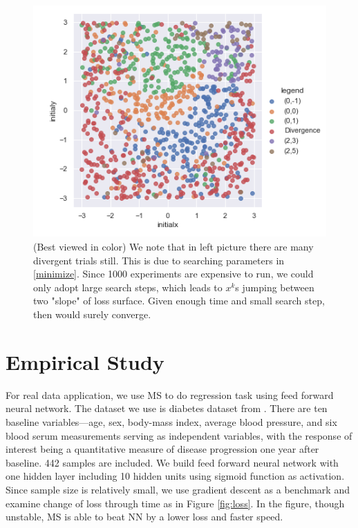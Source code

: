 \documentclass[10pt, oneside]{article}
\begin{document}
  \begin{figure}[H]
\centering

  \includegraphics[width=0.8\linewidth]{convergence1.png}

   \caption{(Best viewed in color) We note that in left picture there are many divergent trials still. This is due to searching parameters in \ref{minimize}. Since 1000 experiments are expensive to run, we could only adopt large search steps, which leads to $x^k$s jumping between two "slope" of loss surface. Given enough time and small search step, then would surely converge.}
\label{fig:convergence}
  \end{figure}
  

\section{Empirical Study}

For real data application, we use MS to do regression task using feed forward neural network. The dataset we use is diabetes dataset from \cite{lars}. There are ten baseline variables---age, sex, body-mass index, average blood pressure, and six blood serum measurements serving as independent variables, with the response of interest being a quantitative measure of disease progression one year after baseline. 442 samples are included. We build feed forward neural network with one hidden layer including 10 hidden units using sigmoid function as activation. Since sample size is relatively small, we use gradient descent as a benchmark and examine change of loss through time as in Figure \ref{fig:loss}. In the figure, though unstable, MS is able to beat NN by a lower loss and faster speed. 
\end{document}
